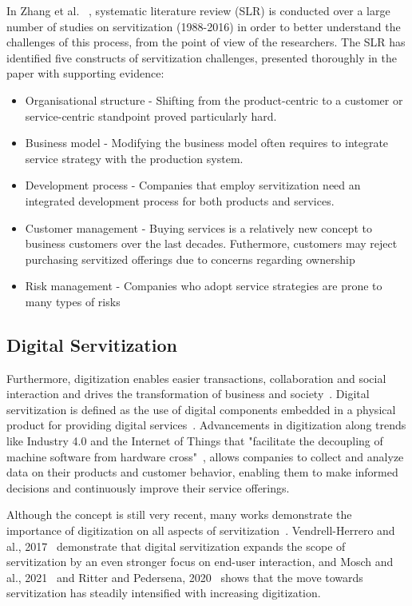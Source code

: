 \documentclass[sigplan,screen,nonacm]{acmart}
\begin{document}
In Zhang et al. ~\cite{zhang2017challenges}, systematic literature review (SLR) is conducted over a large number of studies on servitization (1988-2016) in order to better understand the challenges of this process, from the point of view of the researchers. The SLR has identified five constructs of servitization challenges, presented thoroughly in the paper with supporting evidence:
\begin{itemize}
\setlength{\parskip}{0pt}
  \item Organisational structure - Shifting from the product-centric to a customer or service-centric standpoint proved particularly hard.
  \item Business model - Modifying the business model often requires to integrate service strategy with the production system.
  \item Development process - Companies that employ servitization need an integrated development process for both products and services.
  \item Customer management - Buying services is a relatively new concept to business customers over the last decades. Futhermore, customers may reject purchasing servitized offerings due to concerns regarding ownership
   \item Risk management - Companies who adopt service strategies are prone to many types of risks
\end{itemize}

\subsection{Digital Servitization}
\label{sec:digital-servitization}
Furthermore, digitization enables easier transactions, collaboration and social interaction and drives the transformation of business and society~\cite{loebbecke2015reflections}. Digital servitization is defined as the use of digital components embedded in a physical product for providing digital services~\cite{holmstrom2014digital}. Advancements in digitization along trends like Industry 4.0 and the Internet of Things that "facilitate the decoupling of machine software from hardware cross"~\cite{kowalkowski2017servitization}, allows companies to collect and analyze data on their products and customer behavior, enabling them to make informed decisions and continuously improve their service offerings. 

Although the concept is still very recent, many works demonstrate the importance of digitization on all aspects of servitization~\cite{cenamor2017adopting,gebauer2021digital, baines2020framing, tronvoll2020transformational}. Vendrell-Herrero and al., 2017~\cite{vendrell2017servitization} demonstrate that digital servitization expands the scope of servitization by an even stronger focus on end-user interaction, and Mosch and al., 2021~\cite{mosch2021trapped} and Ritter and Pedersena, 2020~\cite{ritter2020digitization} shows that the move towards servitization has steadily intensified with increasing digitization. 
\end{document}
